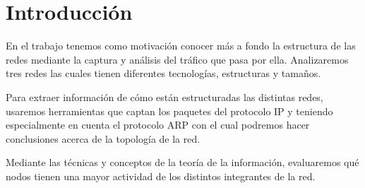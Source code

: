 \section{Introducción}

En el trabajo tenemos como motivación conocer más a fondo la estructura de las redes mediante la captura y análisis del tráfico que pasa por ella. Analizaremos tres redes las cuales tienen diferentes tecnologías, estructuras y tamaños.

Para extraer información de cómo están estructuradas las distintas redes, usaremos herramientas que captan los paquetes del protocolo IP y teniendo especialmente en cuenta el protocolo ARP con el cual podremos hacer conclusiones acerca de la topología de la red.

Mediante las técnicas y conceptos de la teoría de la información, evaluaremos qué nodos tienen una mayor actividad de los distintos integrantes de la red.